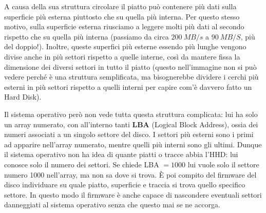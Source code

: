 \documentclass[11pt, a4paper, titlepage, oneside]{scrbook}
\begin{document}
A causa della sua struttura circolare il piatto può contenere più dati sulla superficie più esterna piuttosto che su quella più interna. Per questo stesso motivo, sulla superficie esterna riusciamo a leggere molti più dati al secondo rispetto che su quella più interna (passiamo da circa $\SI{200}{MB/s}$ a $\SI{90}{MB/S}$, più del doppio!). Inoltre, queste superfici più esterne essendo più lunghe vengono divise anche in più settori rispetto a quelle interne, così da mantere fissa la dimensione dei diversi settori in tutto il piatto (questo nell'immagine non si può vedere perché è una struttura semplificata, ma bisognerebbe dividere i cerchi più esterni in più settori rispetto a quelli interni per capire com'è davvero fatto un Hard Disk). 

Il sistema operativo però non vede tutta questa struttura complicata: lui ha solo un array numerato, con all'interno tanti \textbf{LBA} (Logical Block Address), ossia dei numeri associati a un singolo settore del disco. I settori più esterni sono i primi ad apparire nell'array numerato, mentre quelli più interni sono gli ultimi. Dunque il sistema operativo non ha idea di quante piatti o tracce abbia l'HHD: lui conosce solo il numero dei settori. Se chiede LBA $= 1000$ lui vuole solo il settore numero 1000 nell'array, ma non sa dove si trova. È poi compito del firmware del disco individuare su quale piatto, superficie e traccia si trova quello specifico settore. In questo modo il firmware è anche capace di nascondere eventuali settori danneggiati al sistema operativo senza che questo mai se ne accorga.
\end{document}
